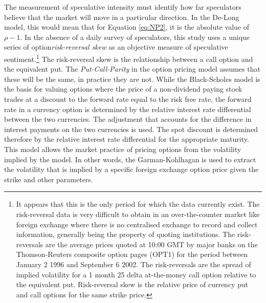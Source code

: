 \documentclass[preprint,12pt,authoryear]{elsarticle}
\begin{document}
The measurement of speculative intensity must identify how far speculators believe that the market will move in a particular direction. In the De-Long model, this would mean that for Equation \ref{eq:NP2}, it is the absolute value of $\rho - 1$.  In the absence of a daily survey of speculators, this study uses a unique series of option\emph{risk-reversal skew} as an objective measure of speculative sentiment.\footnote{It appears that this is the only period for which the data currently exist.  The risk-reversal data is very difficult to obtain in an over-the-counter market like foreign exchange where there is no centralised exchange to record and collect information, generally being the property of quoting institutions.  The risk-reversals are the average prices quoted at 10:00 GMT by major banks on the Thomson-Reuters composite option pages (OPT1)  for the period between January 2 1996 and September 6 2002.  The risk-reversals are the spread of implied volatility for a 1 month 25 delta at-the-money call option relative to the equivalent put.  Risk-reversal skew is the relative price of currency put and call options for the same strike price.} The risk-reversal skew is the relationship between a call option and the equivalent put. The \emph{Put-Call-Parity} in the  \citet{Black1973Options} option pricing model assumes that these will be the same, in practice they are not. While the Black-Scholes model is the basis for valuing options where the price of a non-dividend paying stock trades at a discount to the forward rate equal to the risk free rate, the forward rate in a currency option is determined by the relative interest rate differential between the two currencies.   The \citet{GarmanKohlhagan} adjustment that accounts for the difference in interest payments on the two currencies is used.   The spot discount is determined therefore by the relative interest rate differential for the appropriate maturity.   This model allows the market practice of pricing options from the volatility implied by the model.  In other words, the Garman-Kohlhagan is used to extract the volatility that is implied by a specific foreign exchange option price given the strike and other parameters.    
\end{document}
